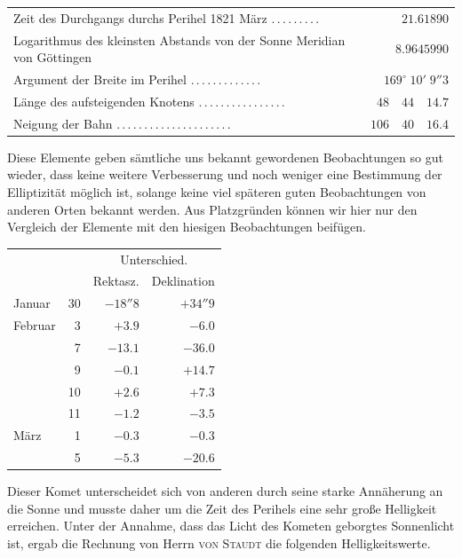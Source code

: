 \begin{center}
\small
\begin{tabular}{p{.73\linewidth}r}
Zeit des Durchgangs durchs Perihel 1821 März \mbox{.\,.\,.\,.\,.\,.\,.\,.\,.} & $21.61890$ \\
Logarithmus des kleinsten Abstands von der Sonne Meridian von Göttingen & $8.9645990$ \\
Argument der Breite im Perihel \mbox{.\,.\,.\,.\,.\,.\,.\,.\,.\,.\,.\,.\,.} & $169^\circ\;10'\;9''3$ \\
Länge des aufsteigenden Knotens \mbox{.\,.\,.\,.\,.\,.\,.\,.\,.\,.\,.\,.\,.\,.\,.\,.} & $48\quad44\quad14.7$ \\
Neigung der Bahn \mbox{.\,.\,.\,.\,.\,.\,.\,.\,.\,.\,.\,.\,.\,.\,.\,.\,.\,.\,.\,.\,.} & $106\quad40\quad16.4$ \\
\end{tabular}
\end{center}

Diese Elemente geben sämtliche uns bekannt gewordenen Beobachtungen so gut wieder, dass keine weitere Verbesserung und noch weniger eine Bestimmung der Elliptizität möglich ist, solange keine viel späteren guten Beobachtungen von anderen Orten bekannt werden. Aus Platzgründen können wir hier nur den Vergleich der Elemente mit den hiesigen Beobachtungen beifügen.

\begin{center}
\begin{tabular}{lr|r|r}
& & \multicolumn{2}{c}{Unterschied.} \\
& & Rektasz. & Deklination \\
\hline
Januar & 30 & $-18''8$ & $+34''9$ \\
Februar & 3 & $+3.9$ & $-6.0$ \\
& 7 & $-13.1$ & $-36.0$ \\
& 9 & $-0.1$ & $+14.7$ \\
& 10 & $+2.6$ & $+7.3$ \\
& 11 & $-1.2$ & $-3.5$ \\
März & 1 & $-0.3$ & $-0.3$ \\
& 5 & $-5.3$ & $-20.6$ \\
\end{tabular}
\end{center}

Dieser Komet unterscheidet sich von anderen durch seine starke Annäherung an die Sonne und musste daher um die Zeit des Perihels eine sehr große Helligkeit erreichen. Unter der Annahme, dass das Licht des Kometen geborgtes Sonnenlicht ist, ergab die Rechnung von Herrn \textsc{von Staudt} die folgenden Helligkeitswerte.

